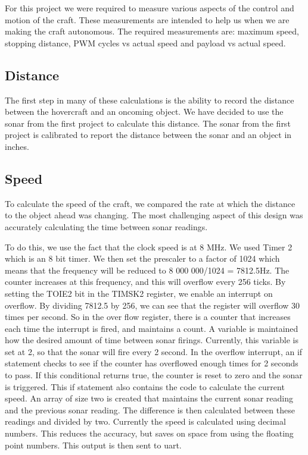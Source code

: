 For this project we were required to measure various aspects of the control and motion of the craft. These measurements are intended to help us when we are making the craft autonomous. The required measurements are: maximum speed, stopping distance, PWM cycles vs actual speed and payload vs actual speed.

\subsection{Distance}
The first step in many of these calculations is the ability to record the distance between the hovercraft and an oncoming object. We have decided to use the sonar from the first project to calculate this distance. The sonar from the first project is calibrated to report the distance between the sonar and an object in inches.

\subsection{Speed}
To calculate the speed of the craft, we compared the rate at which the distance to the object ahead was changing. The most challenging aspect of this design was accurately calculating the time between sonar readings.

To do this, we use the fact that the clock speed is at 8 MHz. We used Timer 2 which is an 8 bit timer. We then set the prescaler to a factor of 1024 which means that the frequency will be reduced to 8 000 000/1024 = 7812.5Hz. The counter increases at this frequency, and this will overflow every 256 ticks. By setting the TOIE2 bit in the TIMSK2 register, we enable an interrupt on overflow. By dividing 7812.5 by 256, we can see that the register will overflow 30 times per second. So in the over flow register, there is a counter that increases each time the interrupt is fired, and maintains a count. A variable is maintained how the desired amount of time between sonar firings. Currently, this variable is set at 2, so that the sonar will fire every 2 second. In the overflow interrupt, an if statement checks to see if the counter has overflowed enough times for 2 seconds to pass. If this conditional returns true, the counter is reset to zero and the sonar is triggered. This if statement also contains the code to calculate the current speed. An array of size two is created that maintains the current sonar reading and the previous sonar reading. The difference is then calculated between these readings and divided by two. Currently the speed is calculated using decimal numbers. This reduces the accuracy, but saves on space from using the floating point numbers. This output is then sent to uart.

